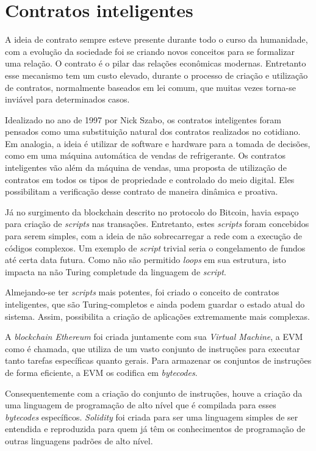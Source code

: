 \documentclass{ufsctex/ufsctex}
\begin{document}
\section{Contratos inteligentes} A ideia de contrato sempre esteve presente
durante todo o curso da humanidade, com a evolução da sociedade foi se criando
novos conceitos para se formalizar uma relação. O contrato é o pilar das
relações econômicas modernas. Entretanto esse mecanismo tem um custo elevado,
durante o processo de criação e utilização de contratos, normalmente baseados em
lei comum, que muitas vezes torna-se inviável para determinados casos.

Idealizado no ano de 1997 por Nick Szabo, os contratos inteligentes foram
pensados como uma substituição natural dos contratos realizados no cotidiano.
Em analogia, a ideia é utilizar de software e hardware para a tomada de
decisões, como em uma máquina automática de vendas de refrigerante. Os
contratos inteligentes vão além da máquina de vendas, uma proposta de
utilização de contratos em todos os tipos de propriedade e controlado do meio
digital. Eles possibilitam a verificação desse contrato de maneira dinâmica e
proativa.\cite{szabo-smart}

Já no surgimento da blockchain descrito no protocolo do Bitcoin, havia espaço
para criação de \textit{scripts} nas transações. Entretanto, estes
\textit{scripts} foram concebidos para serem simples, com a ideia de não
sobrecarregar a rede com a execução de códigos complexos. Um exemplo de
\textit{script} trivial seria o congelamento de fundos até certa data futura.
Como não são  permitido \textit{loops} em sua estrutura, isto impacta na não
Turing completude da linguagem de \textit{script}.\cite{nakamoto2012bitcoin}

Almejando-se ter \textit{scripts} mais potentes, foi criado o conceito de
contratos inteligentes, que são Turing-completos e ainda podem guardar o estado
atual do sistema.  Assim, possibilita a criação de aplicações extremamente mais
complexas.\cite{ethereum}

A \textit{blockchain Ethereum} foi criada juntamente com sua \textit{Virtual
Machine}, a EVM como é chamada, que
utiliza de um vasto conjunto de instruções para executar tanto tarefas
específicas quanto gerais. Para armazenar os conjuntos de instruções de forma
eficiente, a EVM os codifica em \textit{bytecodes}.\cite{wood2014yellow}

Consequentemente com a criação do conjunto de instruções, houve a criação da uma
linguagem de programação de alto nível que é compilada para esses
\textit{bytecodes} específicos.  \textit{Solidity} foi criada para ser uma
linguagem simples de ser entendida e reproduzida para quem já têm os
conhecimentos de programação de outras linguagens padrões de alto nível.
\cite{solidity}
\end{document}
